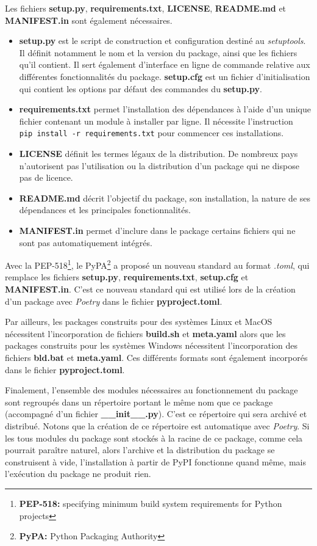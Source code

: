 \documentclass[twoside,a4paper,11pt,frenchb,openany]{report}
\begin{document}
Les fichiers \textbf{setup.py}, \textbf{requirements.txt}, \textbf{LICENSE},  \textbf{README.md} et \textbf{MANIFEST.in} sont également nécessaires.  
\begin{itemize}
\item \textbf{setup.py} est le script de construction et configuration destiné au \textit{setuptools}. Il définit notamment le nom et la version du package, ainsi que les fichiers qu'il contient. Il sert également d'interface en ligne de commande relative aux différentes fonctionnalités du package. \textbf{setup.cfg} est un fichier d'initialisation qui contient les options par défaut des commandes du \textbf{setup.py}.
\item \textbf{requirements.txt} permet l'installation des dépendances à l'aide d'un unique fichier contenant un module à installer par ligne. Il nécessite l'instruction 
\texttt{  pip install -r requirements.txt}
pour commencer ces installations.
\item \textbf{LICENSE} définit les termes légaux de la distribution. De nombreux pays n'autorisent pas l'utilisation ou la distribution d'un package qui ne dispose pas de licence.
\item \textbf{README.md} décrit l'objectif du package, son installation, la nature de ses dépendances et les principales fonctionnalités.
\item \textbf{MANIFEST.in} permet d'inclure dans le package certains fichiers qui ne sont pas automatiquement intégrés. 
\end{itemize}

Avec la PEP-518\footnote{\textbf{PEP-518:} specifying minimum build system requirements for Python projects}, le PyPA\footnote{\textbf{PyPA:} Python Packaging Authority} a proposé un nouveau standard au format \textit{.toml}, qui remplace les fichiers \textbf{setup.py}, \textbf{requirements.txt}, \textbf{setup.cfg} et \textbf{MANIFEST.in}. C'est ce nouveau standard qui est utilisé lors de la création d'un package avec \textit{Poetry} dans le fichier \textbf{pyproject.toml}.

 Par ailleurs, les packages construits pour des systèmes Linux et MacOS nécessitent l'incorporation de fichiers \textbf{build.sh} et \textbf{meta.yaml} alors que les packages construits pour les systèmes Windows nécessitent l'incorporation des fichiers \textbf{bld.bat} et \textbf{meta.yaml}. Ces différents formats sont également incorporés dans le fichier \textbf{pyproject.toml}.

Finalement, l'ensemble des modules nécessaires au fonctionnement du package sont regroupés dans un répertoire portant le même nom que ce package (accompagné d'un fichier \textbf{\_\_init\_\_.py}). C'est ce répertoire qui sera archivé et distribué. Notons que la création de ce répertoire est automatique avec \textit{Poetry}. Si les tous modules du package sont stockés à la racine de ce package, comme cela pourrait paraître naturel, alors l'archive et la distribution du package se construisent à vide, l'installation à partir de PyPI fonctionne quand même, mais l'exécution du package ne produit rien.
\end{document}
